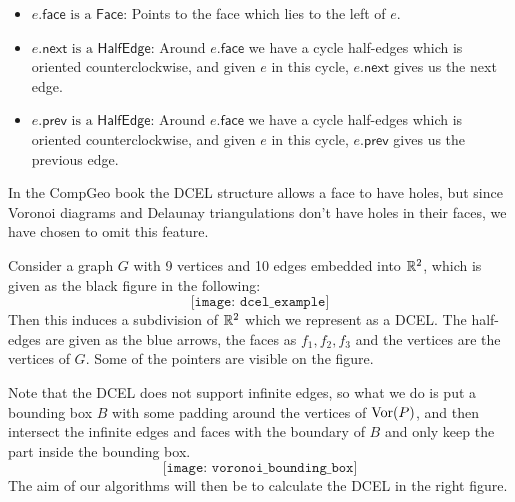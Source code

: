 \begin{defn}[DCEL]
\begin{description}
\begin{itemize}
    \item $e.\textsf{face} \text{ is a } \textsf{Face}$: Points to the face which lies to the left of $e$.
    \item $e.\textsf{next} \text{ is a } \textsf{HalfEdge}$: Around $e.\textsf{face}$ we have a cycle half-edges which is oriented counterclockwise, and given $e$ in this cycle, $e.\textsf{next}$ gives us the next edge.
    \item $e.\textsf{prev} \text{ is a } \textsf{HalfEdge}$: Around $e.\textsf{face}$ we have a cycle half-edges which is oriented counterclockwise, and given $e$ in this cycle, $e.\textsf{prev}$ gives us the previous edge.
  \end{itemize}
\end{description}
\end{defn}

\begin{rmk}
In the CompGeo book the DCEL structure allows a face to have holes, but since Voronoi diagrams and Delaunay triangulations don't have holes in their faces, we have chosen to omit this feature.
\end{rmk}

\begin{ex}
Consider a graph $G$ with 9 vertices and 10 edges embedded into $\mathbb{R}^2$, which is given as the black figure in the following:
\[
    \texttt{[image: dcel\_example]} %
\]
Then this induces a subdivision of $\mathbb{R}^2$ which we represent as a DCEL. The half-edges are given as the blue arrows, the faces as $f_1, f_2, f_3$ and the vertices are the vertices of $G$. Some of the pointers are visible on the figure.

\end{ex}

Note that the DCEL does not support infinite edges, so what we do is put a bounding box $B$ with some padding around the vertices of $\operatorname{Vor}(P)$, and then intersect the infinite edges and faces with the boundary of $B$ and only keep the part inside the bounding box.
\[
    \texttt{[image: voronoi\_bounding\_box]} %
\]
The aim of our algorithms will then be to calculate the DCEL in the right figure.

